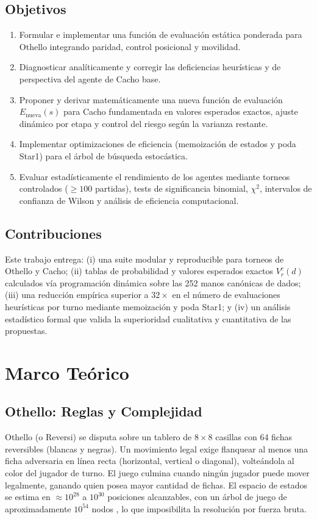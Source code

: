 \documentclass[10pt, a4paper]{article}
\begin{document}
\subsection{Objetivos}
\begin{enumerate}
    \item Formular e implementar una función de evaluación estática ponderada para Othello integrando paridad, control posicional y movilidad.
    \item Diagnosticar analíticamente y corregir las deficiencias heurísticas y de perspectiva del agente de Cacho base.
    \item Proponer y derivar matemáticamente una nueva función de evaluación $E_{\text{nueva}}(s)$ para Cacho fundamentada en valores esperados exactos, ajuste dinámico por etapa y control del riesgo según la varianza restante.
    \item Implementar optimizaciones de eficiencia (memoización de estados y poda Star1) para el árbol de búsqueda estocástica.
    \item Evaluar estadísticamente el rendimiento de los agentes mediante torneos controlados ($\ge 100$ partidas), tests de significancia binomial, $\chi^2$, intervalos de confianza de Wilson y análisis de eficiencia computacional.
\end{enumerate}

\subsection{Contribuciones}
Este trabajo entrega: (i) una suite modular y reproducible para torneos de Othello y Cacho; (ii) tablas de probabilidad y valores esperados exactos $V_r^c(d)$ calculados vía programación dinámica sobre las 252 manos canónicas de dados; (iii) una reducción empírica superior a $32\times$ en el número de evaluaciones heurísticas por turno mediante memoización y poda Star1; y (iv) un análisis estadístico formal que valida la superioridad cualitativa y cuantitativa de las propuestas.

\section{Marco Teórico}

\subsection{Othello: Reglas y Complejidad}
Othello (o Reversi) se disputa sobre un tablero de $8 \times 8$ casillas con 64 fichas reversibles (blancas y negras). Un movimiento legal exige flanquear al menos una ficha adversaria en línea recta (horizontal, vertical o diagonal), volteándola al color del jugador de turno. El juego culmina cuando ningún jugador puede mover legalmente, ganando quien posea mayor cantidad de fichas. El espacio de estados se estima en $\approx 10^{28}$ a $10^{30}$ posiciones alcanzables, con un árbol de juego de aproximadamente $10^{54}$ nodos \cite{buro1999logistello, lee1990bill}, lo que imposibilita la resolución por fuerza bruta.
\end{document}
